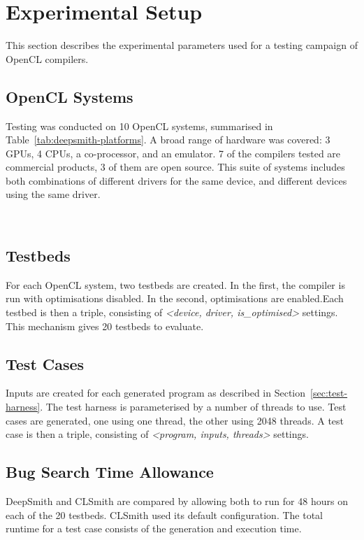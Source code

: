 \section{Experimental Setup}
\label{sec:deepsmith-experimental-setup}

This section describes the experimental parameters used for a testing campaign of OpenCL compilers.

\subsection{OpenCL Systems}

Testing was conducted on 10 OpenCL systems, summarised in Table~\ref{tab:deepsmith-platforms}. A broad range of hardware was covered: 3 GPUs, 4 CPUs, a co-processor, and an emulator. 7 of the compilers tested are commercial products, 3 of them are open source. This suite of systems includes both combinations of different drivers for the same device, and different devices using the same driver.

\begin{table}
  \centering %
  \subfloat[][]{}%
  \\%
  \subfloat[][]{} %
  \caption[OpenCL systems and the number of bug reports submitted to date]{%
    OpenCL systems and the number of bug reports submitted to date (22\% of which have been fixed, the remainder are pending). For each system, two testbeds are created, one with compiler optimisations, the other without.%
  }
  \label{tab:deepsmith-platforms}
\end{table}

\subsection{Testbeds}

For each OpenCL system, two testbeds are created. In the first, the compiler is run with optimisations disabled. In the second, optimisations are enabled.Each testbed is then a triple, consisting of \emph{\textless device, driver, is\_optimised\textgreater} settings. This mechanism gives 20 testbeds to evaluate.


\subsection{Test Cases}

Inputs are created for each generated program as described in Section~\ref{sec:test-harness}. The test harness is parameterised by a number of threads to use. Test cases are generated, one using one thread, the other using 2048 threads. A test case is then a triple, consisting of \emph{\textless program, inputs, threads\textgreater} settings.

\subsection{Bug Search Time Allowance}

DeepSmith and CLSmith are compared by allowing both to run for 48 hours on each of the 20 testbeds. CLSmith used its default configuration. The total runtime for a test case consists of the generation and execution time.
